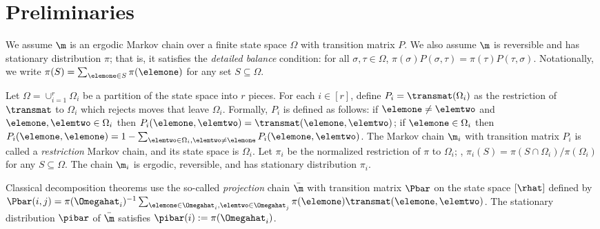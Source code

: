 \section{Preliminaries}\label{sec:prelim}



We assume $\m$ is an ergodic Markov chain over a finite state space 
$\Omega$ with transition matrix $P$. We also assume $\m$ is reversible 
and has stationary distribution $\pi$; that is, it 
satisfies the \emph{detailed balance} condition: for all 
$\sigma,\tau\in\Omega$, 
$\pi(\sigma)P(\sigma,\tau)=\pi(\tau)P(\tau,\sigma)$.  Notationally, 
we write $\pi(S) = \sum_{\elemone\in S} \pi(\elemone)$ for any set 
$S\subseteq \Omega$.

Let $\Omega = \cup_{i=1}^{r} \Omega_i$ be a partition of the state 
space into $r$ pieces.  For each $i \in [r]$, define $P_{i} = 
\transmat(\Omega_i)$ as the restriction of $\transmat$ to $\Omega_i$ 
which rejects moves that leave $\Omega_i$.  
Formally, $P_{i}$ is defined as 
follows: if $\elemone \not= \elemtwo$ and $\elemone,\elemtwo \in 
\Omega_i$ then $P_i(\elemone,\elemtwo)=\transmat(\elemone,\elemtwo)$; 
if $\elemone \in \Omega_i$ then 
$P_i(\elemone,\elemone)=1-\sum_{\elemtwo \in \Omega_i, \elemtwo \not= 
  \elemone} P_i(\elemone,\elemtwo)$.  The Markov chain $\m_i$ with transition matrix $P_i$ is called a \emph{restriction} Markov chain, and its state space is $\Omega_i$.
Let $\pi_i$ be the normalized restriction of 
$\pi$ to $\Omega_i$; \ie,  $\pi_i(S)=\pi(S\cap\Omega_i)/\pi(\Omega_i)$ 
for any $S \subseteq \Omega$.  The chain $\m_i$ is ergodic, 
reversible, and has stationary distribution $\pi_i$.

Classical decomposition theorems use the so-called \emph{projection} chain $\bar{\m}$
with transition matrix $\Pbar$ on the state space $[\rhat]$ defined by 
$\Pbar(i,j)=\pi(\Omegahat_i)^{-1}\sum_{{\elemone\in\Omegahat_i,}{\elemtwo
\in \Omegahat_j}} \pi(\elemone)\transmat(\elemone,\elemtwo)$.
The stationary distribution $\pibar$ of $\bar{\m}$ satisfies $\pibar(i) := 
\pi(\Omegahat_i)$. 

